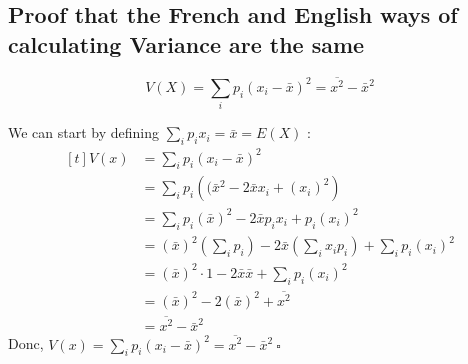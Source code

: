 \documentclass{article}
\begin{document}
\subsection*{Proof that the French and English ways of calculating Variance are the same}
\[ V(X) = \sum_{i} p_i(x_i-\bar{x})^2 = \overline{x^2} - \bar{x}^2\]

\noindent
We can start by defining $\sum_{i}p_i x_i = \bar{x} = E(X)$ :
\[
\begin{aligned}[t] 
V(x) &= \sum_{i} p_i(x_i - \bar{x})^2 \\
    &= \sum_{i} p_i \left((\bar{x}^2 - 2\bar{x}x_i + (x_i)^2\right) \\
    &= \sum_{i} p_i(\bar{x})^2 - 2\bar{x} p_i x_i + p_i(x_i)^2 \\
    &= (\bar{x})^2 \left(\sum_{i}p_i\right) - 2\bar{x}\left(\sum_{i}x_ip_i\right) + \sum_{i}p_i(x_i)^2 \\
    &= (\bar{x})^2 \cdot 1 - 2 \bar{x} \bar{x} + \sum_{i} p_i(x_i)^2 \\
    &= (\bar{x})^2 - 2(\bar{x})^2 + \overline{x^2} \\
    &= \overline{x^2} - \bar{x}^2
\end{aligned}
\]
Donc, $V(x) = \sum_{i}p_i(x_i-\bar{x})^2 = \overline{x^2}-\bar{x}^2\ \square$
\end{document}
